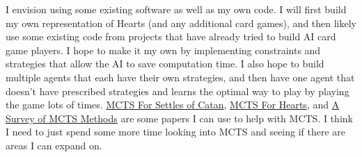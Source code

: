 \documentclass{article}
\begin{document}
I envision using some existing software as well as my own code. I will first build my own representation of Hearts (and any additional card games), and then likely use some existing code from projects that have already tried to build AI card game players. I hope to make it my own by implementing constraints and strategies that allow the AI to save computation time. I also hope to build multiple agents that each have their own strategies, and then have one agent that doesn't have prescribed strategies and learns the optimal way to play by playing the game lots of times.
\href{https://www.researchgate.net/profile/Pieter_Spronck/publication/220716999_Monte-Carlo_Tree_Search_in_Settlers_of_Catan/links/53fd88720cf2364ccc08ca73/Monte-Carlo-Tree-Search-in-Settlers-of-Catan.pdf}{MCTS For Settles of Catan}, \href{https://studenttheses.uu.nl/bitstream/handle/20.500.12932/37736/Thesis_draft.pdf?sequence=1&isAllowed=y}{MCTS For Hearts}, and \href{https://repository.essex.ac.uk/4117/1/MCTS-Survey.pdf}{A Survey of MCTS Methods} are some papers I can use to help with MCTS. 
I think I need to just spend some more time looking into MCTS and seeing if there are areas I can expand on.
\end{document}
